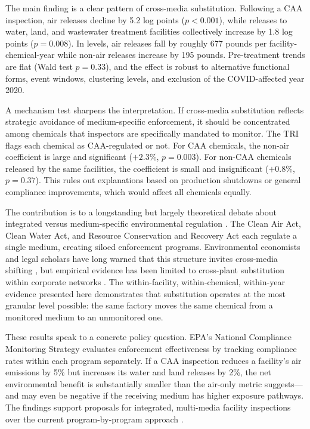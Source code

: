 \documentclass[12pt]{article}
\begin{document}
The main finding is a clear pattern of cross-media substitution. Following a CAA inspection, air releases decline by 5.2 log points ($p < 0.001$), while releases to water, land, and wastewater treatment facilities collectively increase by 1.8 log points ($p = 0.008$). In levels, air releases fall by roughly 677 pounds per facility-chemical-year while non-air releases increase by 195 pounds. Pre-treatment trends are flat (Wald test $p = 0.33$), and the effect is robust to alternative functional forms, event windows, clustering levels, and exclusion of the COVID-affected year 2020.

A mechanism test sharpens the interpretation. If cross-media substitution reflects strategic avoidance of medium-specific enforcement, it should be concentrated among chemicals that inspectors are specifically mandated to monitor. The TRI flags each chemical as CAA-regulated or not. For CAA chemicals, the non-air coefficient is large and significant ($+2.3\%$, $p = 0.003$). For non-CAA chemicals released by the same facilities, the coefficient is small and insignificant ($+0.8\%$, $p = 0.37$). This rules out explanations based on production shutdowns or general compliance improvements, which would affect all chemicals equally.

The contribution is to a longstanding but largely theoretical debate about integrated versus medium-specific environmental regulation \citep{sigman2001crossmedia, greenstone2012does}. The Clean Air Act, Clean Water Act, and Resource Conservation and Recovery Act each regulate a single medium, creating siloed enforcement programs. Environmental economists and legal scholars have long warned that this structure invites cross-media shifting \citep{sigman1996crossmedia, greenstone2012does}, but empirical evidence has been limited to cross-plant substitution within corporate networks \citep{rijal2020crossplant}. The within-facility, within-chemical, within-year evidence presented here demonstrates that substitution operates at the most granular level possible: the same factory moves the same chemical from a monitored medium to an unmonitored one.

These results speak to a concrete policy question. EPA's National Compliance Monitoring Strategy evaluates enforcement effectiveness by tracking compliance rates within each program separately. If a CAA inspection reduces a facility's air emissions by 5\% but increases its water and land releases by 2\%, the net environmental benefit is substantially smaller than the air-only metric suggests---and may even be negative if the receiving medium has higher exposure pathways. The findings support proposals for integrated, multi-media facility inspections over the current program-by-program approach \citep{sigman2001crossmedia}.
\end{document}
